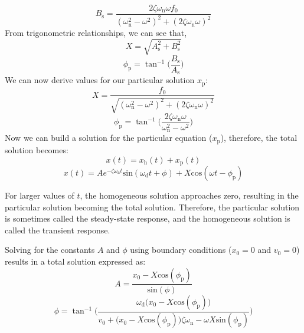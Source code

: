 \documentclass[12pt,letter]{article}
\begin{document}
 \begin{equation}
  B_\text{s} = \frac{2\zeta \omega_\text{n} \omega f_0}{(\omega_\text{n}^2 - \omega^2)^2 +  (2\zeta \omega_\text{n} \omega)^2}
 \end{equation} 
 From trigonometric relationships, we can see that, 
 \begin{equation}
  X = \sqrt{A_\text{s}^2 + B_\text{s}^2}
 \end{equation} 
 \begin{equation}
  \phi_\text{p} = \tan^{-1}\bigg(\frac{B_\text{s}}{A_\text{s}}\bigg)
 \end{equation} 
 We can now derive values for our particular solution $x_\text{p}$:
 \begin{equation}
  X = \frac{f_0}{\sqrt{(\omega_\text{n}^2 - \omega^2)^2 +  (2\zeta \omega_\text{n} \omega)^2}} 
  \label{eq:X_damped}
 \end{equation} 
 \begin{equation}
  \phi_\text{p} = \tan^{-1} \bigg(\frac{2\zeta \omega_\text{n} \omega}{\omega_\text{n}^2 - \omega^2}\bigg)
 \end{equation}    
 Now we can build a solution for the particular equation ($x_\text{p}$), therefore, the total solution becomes:
 \begin{equation}
  x(t) = x_\text{h}(t) + x_\text{p}(t)
 \end{equation}
 \begin{equation}
  x(t) = Ae^{-\zeta \omega_\text{n} t}\text{sin}(\omega_\text{d} t + \phi) +  X \text{cos}(\omega t - \phi_\text{p})
 \end{equation}    
 

 \begin{note}
 For larger values of $t$, the homogeneous solution approaches zero, resulting in the particular solution becoming the total solution. Therefore, the particular solution is sometimes called the steady-state response, and the homogeneous solution is called the transient response. 
 \end{note}

 Solving for the constants $A$ and $\phi$ using boundary conditions ($x_0=0$ and $v_0=0$) results in a total solution expressed as:
 \begin{equation}
  A = \frac{x_0 -X \text{cos}(\phi_\text{p})}{\text{sin}(\phi)}
 \end{equation}    
 \begin{equation}
  \phi =  \tan^{-1} \bigg(\frac{\omega_\text{d} \big( x_0 -X \text{cos}(\phi_\text{p})\big)}{v_0 + \big(x_0 - X \text{cos}(\phi_\text{p})\big) \zeta \omega_\text{n} - \omega X \text{sin}(\phi_\text{p}) }\bigg)
 \end{equation}   
\end{document}
